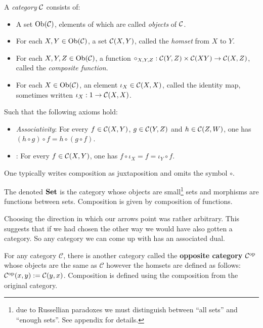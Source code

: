 \begin{defin}
    A \textit{category} $\mathcal{C}$ consists of:
    \begin{itemize}
       \item A set $\text{Ob}(\mathcal{C})$, elements of which are called \textit{objects} of $\mathcal{C}$.
       \item For each $X,Y \in \text{Ob}(\mathcal{C})$, a set $\mathcal{C}(X,Y)$, called the \textit{homset} from $X$ to $Y$.
       \item For each $X, Y, Z\in \text{Ob}(\mathcal{C})$, a function $\circ_{X,Y,Z} : \mathcal{C}(Y, Z) \times \mathcal{C} (X Y) \to \mathcal{C}(X, Z)$, called the \textit{composite function}.
       \item For each $X \in \text{Ob}(\mathcal{C})$, an element $\iota_X \in \mathcal{C}(X,X)$, called the identity map, sometimes written $\iota_X : 1 \to \mathcal{C}(X, X)$.
    \end{itemize}
    Such that the following axioms hold:
    \begin{itemize}
        \item \textit{Associativity}: For every $f \in \mathcal{C}(X,Y)$, $g \in \mathcal{C}(Y,Z)$ and $h \in \mathcal{C}(Z, W)$, one has $(h \circ g ) \circ f = h \circ (g \circ f)$.
        \item {}: For every $f \in \mathcal{C}(X, Y)$, one has $f \circ \iota_X = f = \iota_Y \circ f$.
    \end{itemize}
\end{defin}

\begin{remark}
    One typically writes composition as juxtaposition and omits the symbol $\circ$.
\end{remark}

\begin{example}
	The  denoted ${\normalfont\textbf{Set}}$ is the category whose objects are small\footnote{due to Russellian paradoxes we must distinguish between ``all sets'' and ``enough sets''. See appendix for details. } sets and morphisms are functions between sets. Composition is given by composition of functions. 
\end{example}

Choosing the direction in which our arrows point was rather arbitrary. This suggests that if we had chosen the other way we would have also gotten a category. So any category we can come up with has an associated dual.

\begin{example}
	For any category $\mathcal{C}$, there is another category called the {\bf opposite category} $\mathcal{C}^{\text{op}}$ whose objects are the same as $\mathcal{C}$ however the homsets are defined as follows: $\mathcal{C}^{\text{op}}(x,y):=\mathcal{C}(y,x)$. Composition is defined using the composition from the original category.
\end{example}


